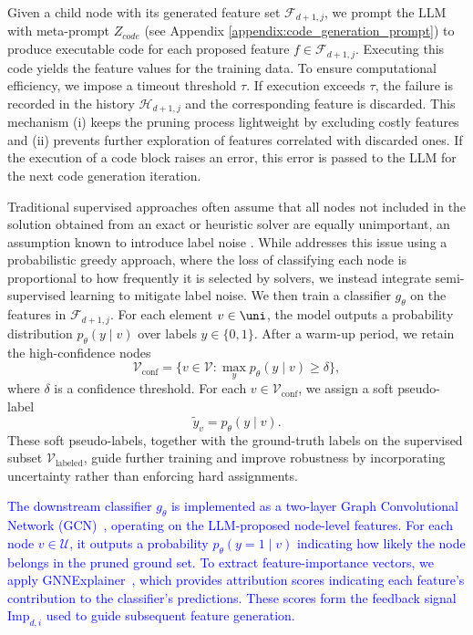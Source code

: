 Given a child node with its generated feature set $\mathcal{F}_{d+1,j}$, we prompt the LLM with meta-prompt $Z_{code}$ (see Appendix \ref{appendix:code_generation_prompt}) to produce executable code for each proposed feature $f \in \mathcal{F}_{d+1,j}$. Executing this code yields the feature values for the training data. To ensure computational efficiency, we impose a timeout threshold $\tau$. If execution exceeds $\tau$, the failure is recorded in the history $\mathcal{H}_{d+1,j}$ and the corresponding feature is discarded. This mechanism (i) keeps the pruning process lightweight by excluding costly features and (ii) prevents further exploration of features correlated with discarded ones. If the execution of a code block raises an error, this error is passed to the LLM for the next code generation iteration.


Traditional supervised approaches \citep{lauri2023learning,tian2024combhelper} often assume that all nodes not included in the solution obtained from an exact or heuristic solver are equally unimportant, an assumption known to introduce label noise \citep{manchanda2020gcomb}. While \citet{manchanda2020gcomb} addresses this issue using a probabilistic greedy approach, where the loss of classifying each node is proportional to how frequently it is selected by solvers, we instead integrate semi-supervised learning to mitigate label noise. We then train a classifier $g_\theta$ on the features in $\mathcal{F}_{d+1,j}$. For each element $v \in \uni$, the model outputs a probability distribution $p_\theta(y \mid v)$ over labels $y \in \{0,1\}$. After a warm-up period, we retain the high-confidence nodes
\[
\mathcal{V}_{\text{conf}} = \{ v \in \mathcal{V} : \max_{y} p_\theta(y \mid v) \geq \delta \},
\]
where $\delta$ is a confidence threshold. For each $v \in \mathcal{V}_{\text{conf}}$, we assign a soft pseudo-label
\[
\tilde{y}_v = p_\theta(y \mid v).
\]
These soft pseudo-labels, together with the ground-truth labels on the supervised subset $\mathcal{V}_{\text{labeled}}$, guide further training and improve robustness by incorporating uncertainty rather than enforcing hard assignments.

\textcolor{blue}{The downstream classifier $g_\theta$ is implemented as a two-layer Graph Convolutional Network (GCN)~\citep{kipf2016semi}, operating on the LLM-proposed node-level features. For each node $v \in \mathcal{U}$, it outputs a probability $p_\theta(y=1 \mid v)$ indicating how likely the node belongs in the pruned ground set. To extract feature-importance vectors, we apply GNNExplainer~\citep{ying2019gnnexplainer}, which provides attribution scores indicating each feature’s contribution to the classifier’s predictions. These scores form the feedback signal $\text{Imp}_{d,i}$ used to guide subsequent feature generation.}

